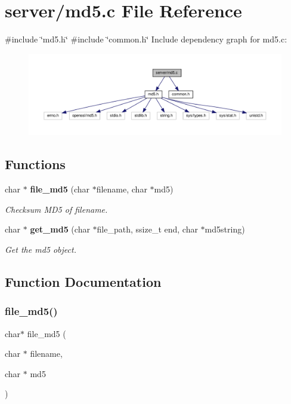 \section{server/md5.c File Reference}
\label{md5_8c}
{\ttfamily \#include \char`\"{}md5.\+h\char`\"{}}\newline
{\ttfamily \#include \char`\"{}common.\+h\char`\"{}}\newline
Include dependency graph for md5.\+c\+:
\nopagebreak
\begin{figure}[H]
\begin{center}
\leavevmode
\includegraphics[width=350pt]{md5_8c__incl}
\end{center}
\end{figure}
\subsection*{Functions}
\begin{DoxyCompactItemize}
\item 
char $\ast$ \textbf{ file\+\_\+md5} (char $\ast$filename, char $\ast$md5)
\begin{DoxyCompactList}\small\item\em Checksum M\+D5 of filename. \end{DoxyCompactList}\item 
char $\ast$ \textbf{ get\+\_\+md5} (char $\ast$file\+\_\+path, ssize\+\_\+t end, char $\ast$md5string)
\begin{DoxyCompactList}\small\item\em Get the md5 object. \end{DoxyCompactList}\end{DoxyCompactItemize}


\subsection{Function Documentation}
\mbox{\label{md5_8c_adaa982699055a63eb33d040e7d13f965}} 
\subsubsection{file\+\_\+md5()}
{\footnotesize\ttfamily char$\ast$ file\+\_\+md5 (\begin{DoxyParamCaption}\item[{char $\ast$}]{filename,  }\item[{char $\ast$}]{md5 }\end{DoxyParamCaption})}



